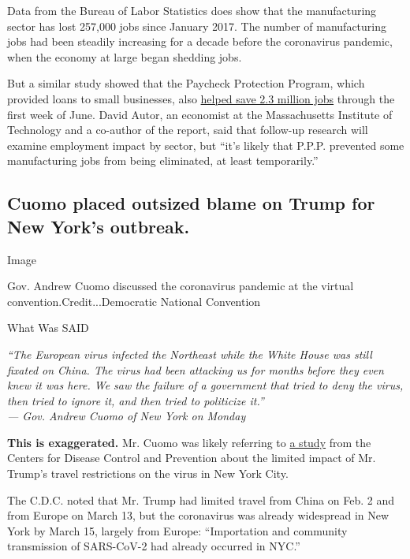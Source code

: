 Data from the Bureau of Labor Statistics does show that the
manufacturing sector has lost 257,000 jobs since January 2017. The
number of manufacturing jobs had been steadily increasing for a decade
before the coronavirus pandemic, when the economy at large began
shedding jobs.

But a similar study showed that the Paycheck Protection Program, which
provided loans to small businesses, also
\href{http://economics.mit.edu/files/20094}{helped save 2.3 million
jobs} through the first week of June. David Autor, an economist at the
Massachusetts Institute of Technology and a co-author of the report,
said that follow-up research will examine employment impact by sector,
but ``it's likely that P.P.P. prevented some manufacturing jobs from
being eliminated, at least temporarily.''

\hypertarget{cuomo-placed-outsized-blame-on-trump-for-new-yorks-outbreak}{%
\subsection{Cuomo placed outsized blame on Trump for New York's
outbreak.}\label{cuomo-placed-outsized-blame-on-trump-for-new-yorks-outbreak}}

Image

Gov. Andrew Cuomo discussed the coronavirus pandemic at the virtual
convention.Credit...Democratic National Convention

What Was SAID

\emph{``The European virus infected the Northeast while the White House
was still fixated on China. The virus had been attacking us for months
before they even knew it was here. We saw the failure of a government
that tried to deny the virus, then tried to ignore it, and then tried to
politicize it.''}\\
\emph{--- Gov. Andrew Cuomo of New York on Monday}

\textbf{This is exaggerated.} Mr. Cuomo was likely referring to
\href{https://www.cdc.gov/mmwr/volumes/69/wr/mm6928a5.htm?s_cid=mm6928a5_w}{a
study} from the Centers for Disease Control and Prevention about the
limited impact of Mr. Trump's travel restrictions on the virus in New
York City.

The C.D.C. noted that Mr. Trump had limited travel from China on Feb. 2
and from Europe on March 13, but the coronavirus was already widespread
in New York by March 15, largely from Europe: ``Importation and
community transmission of SARS-CoV-2 had already occurred in NYC.''

